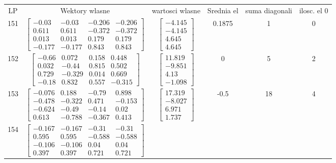 \documentclass[a4paper,12pt]{article}
\begin{document}
\bgroup {} \vspace{0.2in} \begin{tabular}{c c c c c c}
LP &Wektory wlasne & wartosci wlasne & Srednia el & suma diagonali & ilosc. el 0\\
151
&
$\begin{bmatrix} -0.03 & -0.03 & -0.206 & -0.206 \\ 0.611 & 0.611 & -0.372 & -0.372 \\ 0.013 & 0.013 & 0.179 & 0.179 \\ -0.177 & -0.177 & 0.843 & 0.843 \end{bmatrix}$
&
$\begin{bmatrix} -4.145 \\ -4.145 \\ 4.645 \\ 4.645 \end{bmatrix}$
&
0.1875
&
1
&
0
\\
152
&
$\begin{bmatrix} -0.66 & 0.072 & 0.158 & 0.448 \\ 0.032 & -0.44 & 0.815 & 0.502 \\ 0.729 & -0.329 & 0.014 & 0.669 \\ -0.18 & 0.832 & 0.557 & -0.315 \end{bmatrix}$
&
$\begin{bmatrix} 11.819 \\ -9.851 \\ 4.13 \\ -1.098 \end{bmatrix}$
&
0
&
5
&
2
\\
153
&
$\begin{bmatrix} -0.076 & 0.188 & -0.79 & 0.898 \\ -0.478 & -0.322 & 0.471 & -0.153 \\ -0.624 & -0.49 & -0.14 & 0.02 \\ 0.613 & -0.788 & -0.367 & 0.413 \end{bmatrix}$
&
$\begin{bmatrix} 17.319 \\ -8.027 \\ 6.971 \\ 1.737 \end{bmatrix}$
&
-0.5
&
18
&
4
\\
154
&
$\begin{bmatrix} -0.167 & -0.167 & -0.31 & -0.31 \\ 0.595 & 0.595 & -0.588 & -0.588 \\ -0.106 & -0.106 & 0.04 & 0.04 \\ 0.397 & 0.397 & 0.721 & 0.721 \end{bmatrix}$

\end{tabular}
\end{document}
